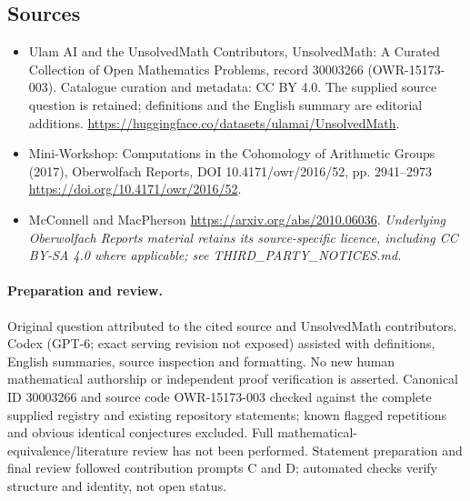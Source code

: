 \documentclass[11pt]{article}
\begin{document}
\subsection{Sources}
\begin{itemize}
\item[\hypertarget{source:30003266:1}{S1}] Ulam AI and the UnsolvedMath Contributors, UnsolvedMath: A Curated Collection of Open Mathematics Problems, record 30003266 (OWR-15173-003). Catalogue curation and metadata: CC BY 4.0. The supplied source question is retained; definitions and the English summary are editorial additions.
\url{https://huggingface.co/datasets/ulamai/UnsolvedMath}.
\item[\hypertarget{source:30003266:2}{S2}] Mini-Workshop: Computations in the Cohomology of Arithmetic Groups (2017), Oberwolfach Reports, DOI 10.4171/owr/2016/52, pp. 2941--2973
\url{https://doi.org/10.4171/owr/2016/52}.
\item[\hypertarget{source:30003266:3}{S3}] McConnell and MacPherson
\url{https://arxiv.org/abs/2010.06036}.
\textit{Underlying Oberwolfach Reports material retains its source-specific licence, including CC BY-SA 4.0 where applicable; see THIRD\_PARTY\_NOTICES.md.}
\end{itemize}
\paragraph{Preparation and review.}
Original question attributed to the cited source and UnsolvedMath contributors. Codex (GPT-6; exact serving revision not exposed) assisted with definitions, English summaries, source inspection and formatting. No new human mathematical authorship or independent proof verification is asserted. Canonical ID 30003266 and source code OWR-15173-003 checked against the complete supplied registry and existing repository statements; known flagged repetitions and obvious identical conjectures excluded. Full mathematical-equivalence/literature review has not been performed. Statement preparation and final review followed contribution prompts C and D; automated checks verify structure and identity, not open status.
\label{end:30003266}
\end{document}
